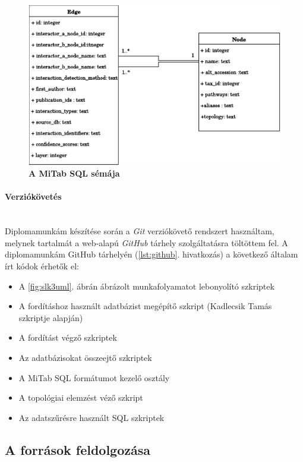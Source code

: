 \documentclass[a4paper,12pt]{article}
\begin{document}
				\begin{figure}[H]
					 \includegraphics[scale=0.7]{img/Mitab-SQL.pdf}
			 		 \centering
			 		 \caption{ \textbf{A MiTab SQL sémája} }
			 		 \label{fig:mitab_scheme}			 		 
				\end{figure}
				
			\paragraph{Verziókövetés} \mbox{}\\
			Diplomamunkám készítése során a \textit{Git} verziókövető rendszert használtam, melynek tartalmát a web-alapú \textit{GitHub} tárhely szolgáltatásra töltöttem fel. A diplomamunkám GitHub tárhelyén (\ref{lst:github}. hivatkozás) a következő általam írt kódok érhetők el: 
				\begin{itemize}
						\item A \ref{fig:slk3uml}. ábrán ábrázolt munkafolyamatot lebonyolító szkriptek
						\item A fordításhoz használt adatbázist megépítő szkript (Kadlecsik Tamás szkriptje alapján)
						\item A fordítást végző szkriptek
						\item Az adatbázisokat összeejtő szkriptek
						\item A MiTab SQL formátumot kezelő osztály
						\item A topológiai elemzést véző szkript
						\item Az adatszűrésre használt SQL szkriptek
				\end{itemize}
				
	\subsection{A források feldolgozása}
		
\end{document}

